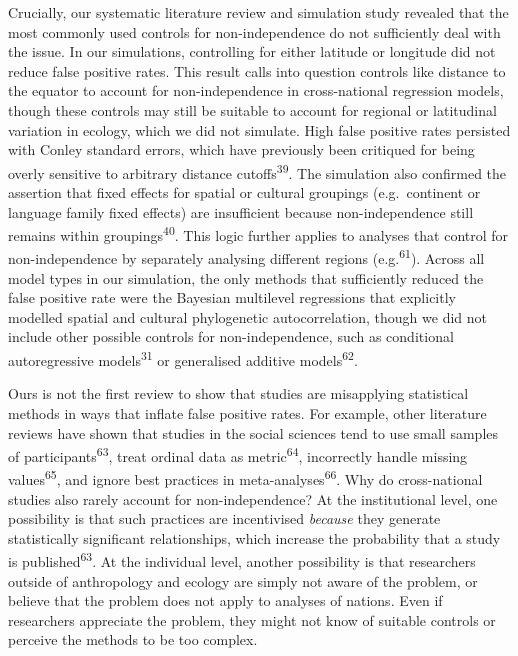 \documentclass[english,man,floatsintext]{apa6}
\begin{document}
Crucially, our systematic literature review and simulation study revealed that the most commonly used controls for non-independence do not sufficiently deal with the issue. In our simulations, controlling for either latitude or longitude did not reduce false positive rates. This result calls into question controls like distance to the equator to account for non-independence in cross-national regression models, though these controls may still be suitable to account for regional or latitudinal variation in ecology, which we did not simulate. High false positive rates persisted with Conley standard errors, which have previously been critiqued for being overly sensitive to arbitrary distance cutoffs\textsuperscript{39}. The simulation also confirmed the assertion that fixed effects for spatial or cultural groupings (e.g.~continent or language family fixed effects) are insufficient because non-independence still remains within groupings\textsuperscript{40}. This logic further applies to analyses that control for non-independence by separately analysing different regions (e.g.\textsuperscript{61}). Across all model types in our simulation, the only methods that sufficiently reduced the false positive rate were the Bayesian multilevel regressions that explicitly modelled spatial and cultural phylogenetic autocorrelation, though we did not include other possible controls for non-independence, such as conditional autoregressive models\textsuperscript{31} or generalised additive models\textsuperscript{62}.

Ours is not the first review to show that studies are misapplying statistical methods in ways that inflate false positive rates. For example, other literature reviews have shown that studies in the social sciences tend to use small samples of participants\textsuperscript{63}, treat ordinal data as metric\textsuperscript{64}, incorrectly handle missing values\textsuperscript{65}, and ignore best practices in meta-analyses\textsuperscript{66}. Why do cross-national studies also rarely account for non-independence? At the institutional level, one possibility is that such practices are incentivised \emph{because} they generate statistically significant relationships, which increase the probability that a study is published\textsuperscript{63}. At the individual level, another possibility is that researchers outside of anthropology and ecology are simply not aware of the problem, or believe that the problem does not apply to analyses of nations. Even if researchers appreciate the problem, they might not know of suitable controls or perceive the methods to be too complex.
\end{document}
